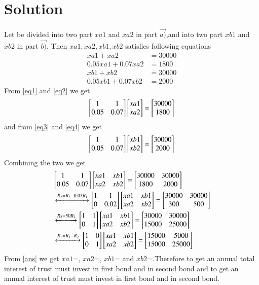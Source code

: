 \documentclass[journal,12pt,twocolumn]{IEEEtran}
\begin{document}
\section{\textbf{Solution}}
Let  be divided into two part $xa1$ and $xa2$ in part $\vec{a)}$,and into two part $xb1$ and $xb2$ in part $\vec{b)}$. Then $xa1,xa2,xb1,xb2$ satisfies following equations
\begin{align}
  xa1+xa2 &= 30000\label{eq1}\\
  0.05xa1+0.07xa2 &= 1800\label{eq2}\\
  xb1+xb2 &= 30000\label{eq3}\\
  0.05xb1+0.07xb2 &= 2000\label{eq4}
\end{align}
From \eqref{eq1} and \eqref{eq2} we get
\begin{align}
  \begin{bmatrix}1&1\\0.05&0.07\end{bmatrix}\begin{bmatrix}xa1\\xa2\end{bmatrix} = \begin{bmatrix}30000\\1800\end{bmatrix}
\end{align}
and from \eqref{eq3} and \eqref{eq4} we get
\begin{align}
  \begin{bmatrix}1&1\\0.05&0.07\end{bmatrix}\begin{bmatrix}xb1\\xb2\end{bmatrix} = \begin{bmatrix}30000\\2000\end{bmatrix}
\end{align}
Combining the two we get
\begin{align}
  &\begin{bmatrix}1&1\\0.05&0.07\end{bmatrix}\begin{bmatrix}xa1&xb1\\xa2&xb2\end{bmatrix} = \begin{bmatrix}30000&30000\\1800&2000\end{bmatrix} \nonumber \\
  &\xleftrightarrow{R_2 = R_2 - 0.05 R_1}\begin{bmatrix}1&1\\0&0.02\end{bmatrix}\begin{bmatrix}xa1&xb1\\xa2&xb2\end{bmatrix} = \begin{bmatrix}30000&30000\\300&500\end{bmatrix} \nonumber \\
  &\xleftrightarrow{R_2 = 50R_2}\begin{bmatrix}1&1\\0&1\end{bmatrix}\begin{bmatrix}xa1&xb1\\xa2&xb2\end{bmatrix} = \begin{bmatrix}30000&30000\\15000&25000\end{bmatrix} \nonumber \\
  &\xleftrightarrow{R_1 = R_1-R_2}\begin{bmatrix}1&0\\0&1\end{bmatrix}\begin{bmatrix}xa1&xb1\\xa2&xb2\end{bmatrix} = \begin{bmatrix}15000&5000\\15000&25000\end{bmatrix}\label{ans}
\end{align}
From \eqref{ans} we get $xa1$=, $xa2$=, $xb1$= and $xb2$=.Therefore to get an annual total interest of  trust must invest  in first bond and  in second bond and to get an annual interest of  trust must invest  in first bond and  in second bond.
\end{document}
